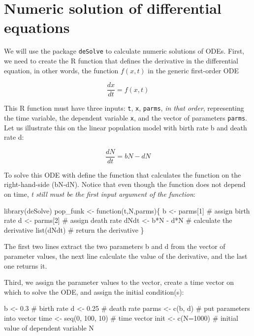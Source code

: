 \documentclass[
  letterpaper,
  DIV=11,
  numbers=noendperiod]{scrreprt}
\newenvironment{Shaded}{\begin{snugshade}}{\end{snugshade}}
\newcommand{\NormalTok}[1]{\textcolor[rgb]{0.00,0.23,0.31}{#1}}
\begin{document}
\hypertarget{numeric-solution-of-differential-equations}{%
\section*{Numeric solution of differential
equations}\label{numeric-solution-of-differential-equations}}


We will use the package \texttt{deSolve} to calculate numeric solutions
of ODEs. First, we need to create the R function that defines the
derivative in the differential equation, in other words, the function
\(f(x,t)\) in the generic first-order ODE

\[ \frac{dx}{dt} = f(x,t)\]

This R function must have three inputs: \texttt{t}, \texttt{x},
\texttt{parms}, \emph{in that order}, representing the time variable,
the dependent variable \texttt{x}, and the vector of parameters
\texttt{parms}. Let us illustrate this on the linear population model
with birth rate b and death rate d:

\[ \frac{dN}{dt} = bN-dN \]

To solve this ODE with define the function that calculates the function
on the right-hand-side (bN-dN). Notice that even though the function
does not depend on time, \emph{t still must be the first input argument
of the function}:

\begin{Shaded}
\begin{Highlighting}[]
\NormalTok{library(deSolve)}
\NormalTok{pop\_funk \textless{}{-} function(t,N,parms)\{}
\NormalTok{  b \textless{}{-} parms[1] \# assign birth rate}
\NormalTok{  d \textless{}{-} parms[2] \# assign death rate}
\NormalTok{  dNdt \textless{}{-} b*N {-} d*N \# calculate the derivative}
\NormalTok{  list(dNdt) \# return the derivative}
\NormalTok{\}}
\end{Highlighting}
\end{Shaded}

The first two lines extract the two parameters b and d from the vector
of parameter values, the next line calculate the value of the
derivative, and the last one returns it.

Third, we assign the parameter values to the vector, create a time
vector on which to solve the ODE, and assign the initial condition(s):

\begin{Shaded}
\begin{Highlighting}[]
\NormalTok{b \textless{}{-} 0.3 \# birth rate}
\NormalTok{d \textless{}{-} 0.25 \# death rate}
\NormalTok{parms \textless{}{-} c(b, d) \# put parameters into vector}
\NormalTok{time \textless{}{-} seq(0, 100, 10) \# time vector}
\NormalTok{init \textless{}{-} c(N=1000) \# initial value of dependent variable N}
\end{Highlighting}
\end{Shaded}
\end{document}
